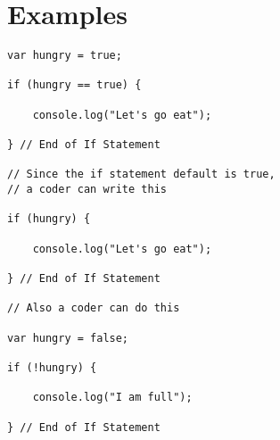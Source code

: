 \documentclass[12pt, letterpaper]{article}
\begin{document}
\section*{Examples}

\begin{lstlisting}
var hungry = true;

if (hungry == true) {

	console.log("Let's go eat");

} // End of If Statement

// Since the if statement default is true,
// a coder can write this

if (hungry) {

	console.log("Let's go eat");

} // End of If Statement

// Also a coder can do this

var hungry = false;

if (!hungry) {

	console.log("I am full");

} // End of If Statement



\end{lstlisting}
\end{document}
